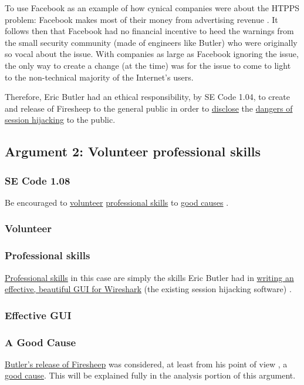 \documentclass[11pt]{article}
\begin{document}
\begin{multicols}{2}
To use Facebook as an example of how cynical companies were about the HTPPS problem: Facebook makes most of their money from  advertising revenue \cite{facebook-revenue}. It follows then that Facebook had no financial incentive to heed the warnings from the small security community (made of engineers like Butler) who were originally so vocal about the issue. With companies as large as Facebook ignoring the issue, the only way to create a change (at the time) was for the issue to come to light to the non-technical majority of the Internet's users.

Therefore, Eric Butler had an ethical responsibility, by SE Code 1.04, to create and release of Firesheep to the general public in order to \uline{disclose} the \uline{dangers of session hijacking} to the public.


\subsection{Argument 2: Volunteer professional skills}
\subsubsection{SE Code 1.08}
Be encouraged to \uline{volunteer} \uline{professional skills} to \uline{good causes} \cite{se-code}.

\subsubsection{Volunteer}

\subsubsection{Professional skills}
\uline{Professional skills} in this case are simply the skills Eric Butler had in \uline{writing an effective, beautiful GUI for Wireshark} (the existing session hijacking software) \cite{wireshark}. 
\subsubsection*{Effective GUI}

\subsubsection{A Good Cause}
\uline{Butler's release of Firesheep} was considered, at least from his point of view \cite{eric-butler}, a \uline{good cause}. This will be explained fully in the analysis portion of this argument.





\end{multicols}
\end{document}
